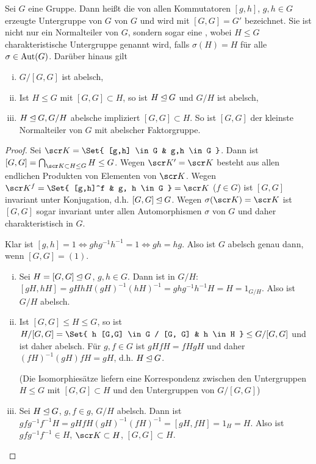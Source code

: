 \begin{kor}
	Sei $G$ eine Gruppe.
	Dann heißt die von allen Kommutatoren $[g,h]$, $g, h \in G$ erzeugte Untergruppe von $G$  von $G$ und wird mit $[G, G] = G'$ bezeichnet.
	Sie ist nicht nur ein Normalteiler von $G$, sondern sogar eine , wobei $H \le G$ charakteristische Untergruppe genannt wird, falls $\sigma(H) = H$ für alle $\sigma \in \operatorname{Aut}(G)$.
	Darüber hinaus gilt
	\begin{enumerate}[i)]
		\item
			$G / [G, G]$ ist abelsch,
		\item
			Ist $H \le G$ mit $[G, G] \subset H$, so ist $H \mathbin{\trianglelefteq} G$ und $G / H$ ist abelsch,
		\item
			$H \mathbin{\trianglelefteq} G, G / H$ abelsche impliziert $[G, G] \subset H$.
			So ist $[G, G]$ der kleinste Normalteiler von $G$ mit abelscher Faktorgruppe.
	\end{enumerate}
	\begin{proof}
		Sei $\scr K = \Set{ [g,h] \in G & g,h \in G }$.
		Dann ist $[G, G] = \bigcap_{\scr K \subset H \le G} H \le G$.
		Wegen $\scr K' = \scr K$ besteht aus allen endlichen Produkten von Elementen von $\scr K$.
		Wegen $\scr K^f = \Set{ [g,h]^f & g, h \in G } = \scr K$ ($f \in G$) ist $[G, G]$ invariant unter Konjugation, d.h. $[G, G] \mathbin{\trianglelefteq} G$.
		Wegen $\sigma(\scr K) = \scr K$ ist $[G, G]$ sogar invariant unter allen Automorphismen $\sigma$ von $G$ und daher charakteristisch in $G$.

		Klar ist $[g,h] = 1 \iff ghg^{-1}h^{-1} = 1 \iff gh = hg$.
		Also ist $G$ abelsch genau dann, wenn $[G, G] = (1)$.

		\begin{enumerate}[i)]
			\item
				Sei $H = [G, G] \mathbin{\trianglelefteq} G$, $g, h \in G$.
				Dann ist in $G / H$: $[gH, hH] = gH hH (gH)^{-1}(hH)^{-1} = ghg^{-1}h^{-1} H = H = 1_{G / H}$.
				Also ist $G / H$ abelsch.
			\item
				Ist $[G, G] \le H \le G$, so ist $H / [G,G] = \Set{ h [G,G] \in G / [G, G] & h \in H } \le G / [G, G]$ und ist daher abelsch.
				Für $g, f \in G$ ist $gH fH = fH gH$ und daher $(fH)^{-1} (gH) fH = gH$, d.h. $H \mathbin{\trianglelefteq} G$.

				(Die Isomorphiesätze liefern eine Korrespondenz zwischen den Untergruppen $H \le G$ mit $[G, G] \subset H$ und den Untergruppen von $G / [G,G]$)
			\item
				Sei $H \mathbin{\trianglelefteq} G$, $g, f \in g$, $G / H$ abelsch.
				Dann ist $gfg^{-1}f^{-1} H = gH fH (gH)^{-1} (fH)^{-1} = [gH, fH] = 1_H = H$.
				Also ist $gf g^{-1}f^{-1} \in H$, $\scr K \subset H$, $[G, G] \subset H$.
		\end{enumerate}
	\end{proof}
\end{kor}

